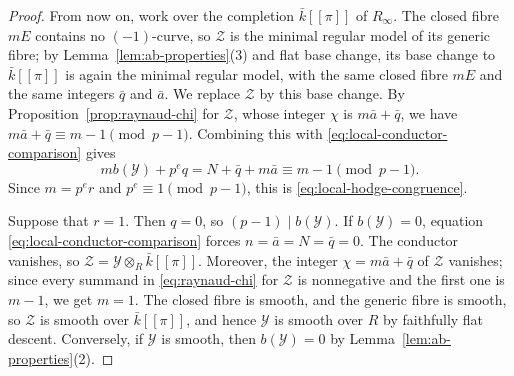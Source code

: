 \begin{proof}
From now on, work over the completion $\bar k[[\pi]]$ of $R_\infty$.
The closed fibre $mE$ contains no $(-1)$-curve, so $\mathcal Z$ is the minimal regular model of its generic fibre; by Lemma~\ref{lem:ab-properties}(3) and flat base change, its base change to $\bar k[[\pi]]$ is again the minimal regular model, with the same closed fibre $mE$ and the same integers $\bar q$ and $\bar a$.
We replace $\mathcal Z$ by this base change.
By Proposition~\ref{prop:raynaud-chi} for $\mathcal Z$, whose integer $\chi$ is $m\bar a+\bar q$, we have $m\bar a+\bar q\equiv m-1\pmod{p-1}$.
Combining this with \eqref{eq:local-conductor-comparison} gives
\[
  m b(\mathcal Y)+p^e q
  =N+\bar q+m\bar a
  \equiv m-1\pmod{p-1}.
\]
Since $m=p^e r$ and $p^e\equiv1\pmod{p-1}$, this is \eqref{eq:local-hodge-congruence}.

Suppose that $r=1$.
Then $q=0$, so $(p-1)\mid b(\mathcal Y)$.
If $b(\mathcal Y)=0$, equation \eqref{eq:local-conductor-comparison} forces $n=\bar a=N=\bar q=0$.
The conductor vanishes, so $\mathcal Z=\mathcal Y\otimes_R\bar k[[\pi]]$.
Moreover, the integer $\chi = m\bar a+\bar q$ of $\mathcal Z$ vanishes; since every summand in \eqref{eq:raynaud-chi} for $\mathcal Z$ is nonnegative and the first one is $m-1$, we get $m=1$.
The closed fibre is smooth, and the generic fibre is smooth, so $\mathcal Z$ is smooth over $\bar k[[\pi]]$, and hence $\mathcal Y$ is smooth over $R$ by faithfully flat descent.
Conversely, if $\mathcal Y$ is smooth, then $b(\mathcal Y)=0$ by Lemma~\ref{lem:ab-properties}(2).
\end{proof}
